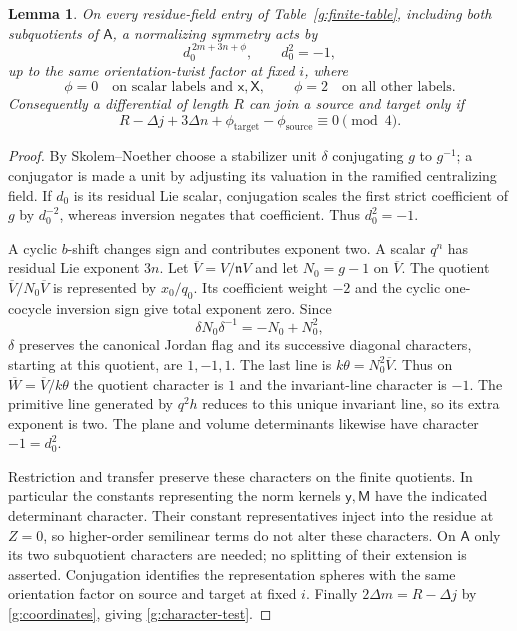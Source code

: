\documentclass[11pt]{article}
\newtheorem{lemma}[theorem]{Lemma}
\theoremstyle{definition}
\theoremstyle{remark}
\numberwithin{equation}{section}
\begin{document}
\begin{lemma}\label{g:character}
On every residue-field entry of Table~\ref{g:finite-table},
including both subquotients of $\mathsf A$, a normalizing
symmetry acts by
\begin{equation}\label{g:character-formula}
 d_0^{\,2m+3n+\phi},\qquad d_0^2=-1,
\end{equation}
up to the same orientation-twist factor at fixed $i$, where
\[
 \phi=0\quad\text{on scalar labels and }\mathsf x,\mathsf X,
 \qquad
 \phi=2\quad\text{on all other labels}.
\]
Consequently a differential of length $R$ can join a source
and target only if
\begin{equation}\label{g:character-test}
 R-\Delta j+3\Delta n+\phi_{\mathrm{target}}
 -\phi_{\mathrm{source}}\equiv0\pmod4.
\end{equation}
\end{lemma}

\begin{proof}
By Skolem--Noether choose a stabilizer unit $\delta$
conjugating $g$ to $g^{-1}$; a conjugator is made a unit
by adjusting its valuation in the ramified centralizing
field.  If $d_0$ is its residual Lie scalar, conjugation
scales the first strict coefficient of $g$ by $d_0^{-2}$,
whereas inversion negates that coefficient.  Thus
$d_0^2=-1$.

A cyclic $b$-shift changes sign and contributes exponent
two.  A scalar $q^n$ has residual Lie exponent $3n$.
Let $\overline V=V/\mathfrak nV$ and let $N_0=g-1$ on
$\overline V$.  The quotient $\overline V/N_0\overline V$
is represented by $x_0/q_0$.  Its coefficient weight $-2$
and the cyclic one-cocycle inversion sign give total
exponent zero.  Since
\[
 \delta N_0\delta^{-1}=-N_0+N_0^2,
\]
$\delta$ preserves the canonical Jordan flag and its
successive diagonal characters, starting at this quotient,
are $1,-1,1$.  The last line is
$k\theta=N_0^2\overline V$.  Thus on
$\overline W=\overline V/k\theta$ the quotient character
is $1$ and the invariant-line character is $-1$.
The primitive line generated by $q^2h$ reduces to this
unique invariant line, so its extra exponent is two.
The plane and volume determinants likewise have
character $-1=d_0^2$.

Restriction and transfer preserve these characters on
the finite quotients.  In particular the constants
representing the norm kernels $\mathsf y,\mathsf M$
have the indicated determinant character.  Their constant
representatives inject into the residue at $Z=0$, so
higher-order semilinear terms do not alter these characters.  On
$\mathsf A$ only its two subquotient characters are
needed; no splitting of their extension is asserted.
Conjugation identifies the representation spheres
with the same orientation factor on source and target
at fixed $i$.  Finally $2\Delta m=R-\Delta j$ by
\eqref{g:coordinates}, giving
\eqref{g:character-test}.
\end{proof}
\end{document}
